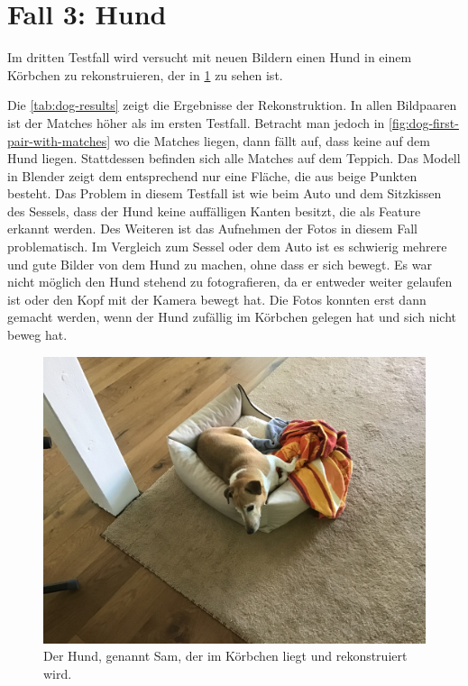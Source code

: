 \section{Fall 3: Hund}
\label{sec:testcase-dog}
Im dritten Testfall wird versucht mit neuen Bildern einen Hund in einem Körbchen zu rekonstruieren, der in \cref{fig:dog-image} zu sehen ist.

Die \cref{tab:dog-results} zeigt die Ergebnisse der Rekonstruktion.
In allen Bildpaaren ist der Matches höher als im ersten Testfall.
Betracht man jedoch in \cref{fig:dog-first-pair-with-matches} wo die Matches liegen, dann fällt auf, dass keine auf dem Hund liegen.
Stattdessen befinden sich alle Matches auf dem Teppich.
Das Modell in Blender zeigt dem entsprechend nur eine Fläche, die aus beige Punkten besteht.
Das Problem in diesem Testfall ist wie beim Auto und dem Sitzkissen des Sessels, dass der Hund keine auffälligen Kanten besitzt, die als Feature erkannt werden.
Des Weiteren ist das Aufnehmen der Fotos in diesem Fall problematisch. 
Im Vergleich zum Sessel oder dem Auto ist es schwierig mehrere und gute Bilder von dem Hund zu machen, ohne dass er sich bewegt. 
Es war nicht möglich den Hund stehend zu fotografieren, da er entweder weiter gelaufen ist oder den Kopf mit der Kamera bewegt hat.
Die Fotos konnten erst dann gemacht werden, wenn der Hund zufällig im Körbchen gelegen hat und sich nicht beweg hat.

\begin{figure}
    \includegraphics[width=\textwidth]{src/img/dog.jpg}
    \caption{Der Hund, genannt Sam, der im Körbchen liegt und rekonstruiert wird.}
    \label{fig:dog-image}
\end{figure}

